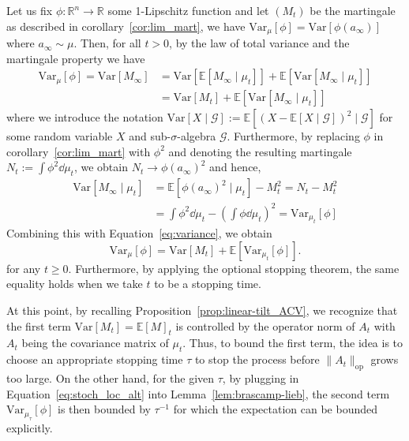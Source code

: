 Let us fix \(\phi : \mathbb{R}^n \to \mathbb{R}\) some 1-Lipschitz function and let \((M_t)\) be the 
martingale as described in corollary~\ref{cor:lim_mart}, we have \(\text{Var}_\mu[\phi] = \text{Var}[\phi(a_\infty)]\) 
where \(a_\infty \sim \mu\).
Then, for all \(t > 0\), by the law of total variance and the martingale property we have
\begin{equation}\label{eq:variance}
  \begin{split}
    \text{Var}_\mu[\phi] = \text{Var}[M_\infty] & = \text{Var}[\mathbb{E}[M_\infty \mid \mu_t]] + \mathbb{E}[\text{Var}[M_\infty \mid \mu_t]]\\
    & = \text{Var}[M_t] + \mathbb{E}[\text{Var}[M_\infty \mid \mu_t]]
  \end{split}
\end{equation}
where we introduce the notation \(\text{Var}[X \mid \mathcal{G}] := \mathbb{E}[(X - \mathbb{E}[X \mid \mathcal{G}])^2 \mid \mathcal{G}]\)
for some random variable \(X\) and sub-\(\sigma\)-algebra \(\mathcal{G}\). Furthermore, by replacing 
\(\phi\) in corollary~\ref{cor:lim_mart} with \(\phi^2\) and denoting the resulting martingale 
\(N_t := \int \phi^2 \dd \mu_t\), we obtain \(N_t \to \phi(a_\infty)^2\) and hence,
\begin{align*}
  \text{Var}[M_\infty \mid \mu_t] & = \mathbb{E}[\phi(a_\infty)^2 \mid \mu_t] - M_t^2 = N_t - M_t^2\\ 
    & = \int \phi^2 \dd \mu_t - \left(\int \phi \dd \mu_t\right)^2 = \text{Var}_{\mu_t}[\phi]
\end{align*}
Combining this with Equation~\eqref{eq:variance}, we obtain
\begin{equation}\label{eq:bound}
  \text{Var}_\mu[\phi] = \text{Var}[M_t] + \mathbb{E}[\text{Var}_{\mu_t}[\phi]].
\end{equation}
for any \(t \ge 0\). Furthermore, by applying the optional stopping theorem, the same equality holds 
when we take \(t\) to be a stopping time. 

At this point, by recalling Proposition~\ref{prop:linear-tilt_ACV}, we recognize that the first term 
\(\text{Var}[M_t] = \mathbb{E}[M]_t\) is controlled by the operator norm of \(A_t\) with \(A_t\) being the covariance matrix of \(\mu_t\).
Thus, to bound the first term, the idea is to choose an appropriate stopping time \(\tau\) to 
stop the process before \(\|A_t\|_\text{op}\) grows too large. On the other hand, for the given \(\tau\), by plugging in 
Equation~\eqref{eq:stoch_loc_alt} into Lemma~\ref{lem:brascamp-lieb},
the second term \(\text{Var}_{\mu_\tau}[\phi]\) is then bounded by \(\tau^{-1}\) for which the
expectation can be bounded explicitly.

